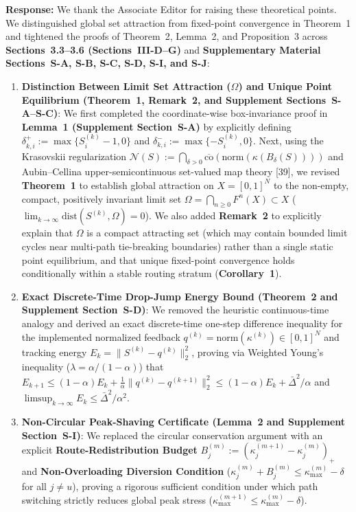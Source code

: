 \documentclass[11pt,a4paper]{article}
\begin{document}
\noindent\textbf{Response:} We thank the Associate Editor for raising these theoretical points. We distinguished global set attraction from fixed-point convergence in Theorem~1 and tightened the proofs of Theorem~2, Lemma~2, and Proposition~3 across \textbf{Sections~3.3--3.6 (Sections~III-D--G)} and \textbf{Supplementary Material Sections~S-A, S-B, S-C, S-D, S-I, and S-J}:
\begin{enumerate}[leftmargin=1.8em]
    \item \textbf{Distinction Between Limit Set Attraction ($\Omega$) and Unique Point Equilibrium (Theorem~1, Remark~2, and Supplement Sections~S-A--S-C)}: We first completed the coordinate-wise box-invariance proof in \textbf{Lemma~1 (Supplement Section~S-A)} by explicitly defining $\delta^+_{k,i} := \max\{S_i^{(k)}-1, 0\}$ and $\delta^-_{k,i} := \max\{-S_i^{(k)}, 0\}$. Next, using the Krasovskii regularization $\mathcal{N}(S) := \bigcap_{\delta>0}\overline{\mathrm{co}}(\mathrm{norm}(\kappa(B_\delta(S))))$ and Aubin--Cellina upper-semicontinuous set-valued map theory [39], we revised \textbf{Theorem~1} to establish global attraction on $X=[0,1]^N$ to the non-empty, compact, positively invariant limit set $\Omega = \bigcap_{n\ge 0} F^n(X) \subset X$ ($\lim_{k\to\infty}\mathrm{dist}(S^{(k)}, \Omega)=0$). We also added \textbf{Remark~2} to explicitly explain that $\Omega$ is a compact attracting set (which may contain bounded limit cycles near multi-path tie-breaking boundaries) rather than a single static point equilibrium, and that unique fixed-point convergence holds conditionally within a stable routing stratum (\textbf{Corollary~1}).
    \item \textbf{Exact Discrete-Time Drop-Jump Energy Bound (Theorem~2 and Supplement Section~S-D)}: We removed the heuristic continuous-time analogy and derived an exact discrete-time one-step difference inequality for the implemented normalized feedback $q^{(k)} = \mathrm{norm}(\kappa^{(k)}) \in [0,1]^N$ and tracking energy $E_k = \|S^{(k)}-q^{(k)}\|_2^2$, proving via Weighted Young's inequality ($\lambda = \alpha/(1-\alpha)$) that $E_{k+1} \le (1-\alpha)E_k + \frac{1}{\alpha}\|q^{(k)}-q^{(k+1)}\|_2^2 \le (1-\alpha)E_k + \bar{\Delta}^2/\alpha$ and $\limsup_{k\to\infty} E_k \le \bar{\Delta}^2/\alpha^2$.
    \item \textbf{Non-Circular Peak-Shaving Certificate (Lemma~2 and Supplement Section~S-I)}: We replaced the circular conservation argument with an explicit \textbf{Route-Redistribution Budget} $B_j^{(m)} := (\kappa_j^{(m+1)}-\kappa_j^{(m)})_+$ and \textbf{Non-Overloading Diversion Condition} ($\kappa_j^{(m)} + B_j^{(m)} \le \kappa_{\max}^{(m)} - \delta$ for all $j \neq u$), proving a rigorous sufficient condition under which path switching strictly reduces global peak stress ($\kappa_{\max}^{(m+1)} \le \kappa_{\max}^{(m)} - \delta$).

\end{enumerate}
\end{document}

